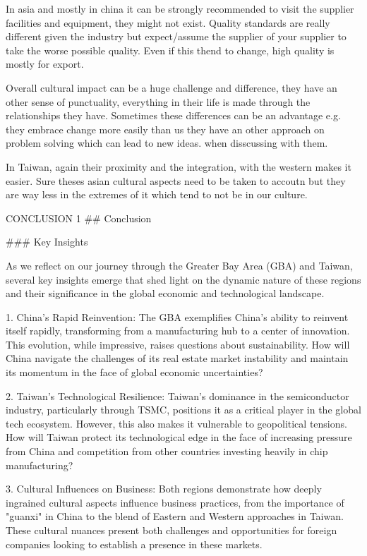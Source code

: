 In asia and mostly in china it can be strongly recommended to visit the supplier facilities and equipment, they might not exist. Quality standards are really different given the industry but expect/assume the supplier of your supplier to take the worse possible quality. Even if this thend to change, high quality is mostly for export. 


Overall cultural impact can be a huge challenge and difference, they have an other sense of punctuality, everything in their life is made through the relationships they have. Sometimes these differences can be an advantage e.g. they embrace change more easily than us they have an other approach on problem solving which can lead to new ideas. when disscussing with them. 

In Taiwan, again their proximity and the integration, with the western makes it easier. Sure theses asian cultural aspects need to be taken to accoutn but they are way less in the extremes of it which tend to not be in our culture.




CONCLUSION 1
## Conclusion

### Key Insights

As we reflect on our journey through the Greater Bay Area (GBA) and Taiwan, several key insights emerge that shed light on the dynamic nature of these regions and their significance in the global economic and technological landscape.

1. China's Rapid Reinvention: The GBA exemplifies China's ability to reinvent itself rapidly, transforming from a manufacturing hub to a center of innovation. This evolution, while impressive, raises questions about sustainability. How will China navigate the challenges of its real estate market instability and maintain its momentum in the face of global economic uncertainties?

2. Taiwan's Technological Resilience: Taiwan's dominance in the semiconductor industry, particularly through TSMC, positions it as a critical player in the global tech ecosystem. However, this also makes it vulnerable to geopolitical tensions. How will Taiwan protect its technological edge in the face of increasing pressure from China and competition from other countries investing heavily in chip manufacturing?

3. Cultural Influences on Business: Both regions demonstrate how deeply ingrained cultural aspects influence business practices, from the importance of "guanxi" in China to the blend of Eastern and Western approaches in Taiwan. These cultural nuances present both challenges and opportunities for foreign companies looking to establish a presence in these markets.

